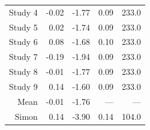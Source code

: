 \begin{table}[!h]
{\begin{tabular}[t]{rrrrr}
\hspace{1em}Study 4 & -0.02 & -1.77 & 0.09 & 233.0\\
\hspace{1em}Study 5 & 0.02 & -1.74 & 0.09 & 233.0\\
\hspace{1em}Study 6 & 0.08 & -1.68 & 0.10 & 233.0\\
\hspace{1em}Study 7 & -0.19 & -1.94 & 0.09 & 233.0\\
\hspace{1em}Study 8 & -0.01 & -1.77 & 0.09 & 233.0\\
\hspace{1em}Study 9 & 0.14 & -1.60 & 0.09 & 233.0\\
\hspace{1em}Mean & -0.01 & -1.76 & --- & ---\\
\hspace{1em}Simon & 0.14 & -3.90 & 0.14 & 104.0\\
\bottomrule
\end{tabular}}
\end{table}

